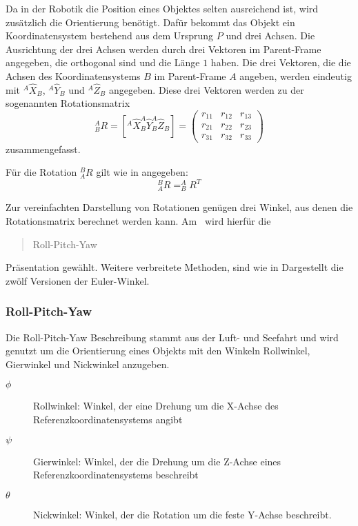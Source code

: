 Da in der Robotik die Position eines Objektes selten ausreichend ist, wird zusätzlich 
die Orientierung benötigt. Dafür bekommt das Objekt ein Koordinatensystem bestehend
aus dem Ursprung $P$ und drei Achsen. Die Ausrichtung der drei Achsen werden durch
drei Vektoren im Parent-Frame angegeben, die orthogonal sind und die Länge $1$
haben. Die drei Vektoren, die die Achsen des Koordinatensystems $B$ im Parent-Frame
$A$ angeben, werden eindeutig mit $^A\hat{X}_B$, $^A\hat{Y}_B$ und $^A\hat{Z}_B$
angegeben. Diese drei Vektoren werden zu der sogenannten Rotationsmatrix
\begin{equation}
  ^A_BR = [ ^A\hat{X}_B ^A\hat{Y}_B ^A\hat{Z}_B ] = \begin{pmatrix}
    r_{11}&r_{12}&r_{13}\\
    r_{21}&r_{22}&r_{23}\\
    r_{31}&r_{32}&r_{33}
  \end{pmatrix}
  \label{eq:rotationsmatrix}
\end{equation}
zusammengefasst.

Für die Rotation $^B_AR$ gilt wie in \cite{craig2005} angegeben:
\begin{equation}
  ^B_AR=^A_BR^T
\end{equation}


Zur vereinfachten Darstellung von Rotationen genügen drei Winkel, aus denen die
Rotationsmatrix berechnet werden kann. Am \cob\ wird hierfür die \begin{quote}Roll-Pitch-Yaw\end{quote}
Präsentation gewählt. Weitere verbreitete Methoden, sind wie in \cite{sciavicco2000modelling} 
Dargestellt die zwölf Versionen der Euler-Winkel.

\subsubsection{Roll-Pitch-Yaw}
\label{ssub:Roll-Pitch-Yaw}

Die Roll-Pitch-Yaw Beschreibung stammt aus der Luft- und Seefahrt und wird genutzt
um die Orientierung eines Objekts mit den Winkeln Rollwinkel, Gierwinkel und 
Nickwinkel anzugeben.
\begin{description}
  \item[$\phi$]Rollwinkel: Winkel, der eine Drehung um die X-Achse des Referenzkoordinatensystems
    angibt
  \item[$\psi$]Gierwinkel: Winkel, der die Drehung um die Z-Achse eines Referenzkoordinatensystems
    beschreibt
  \item[$\theta$]Nickwinkel: Winkel, der die Rotation um die feste Y-Achse beschreibt.

\end{description}


